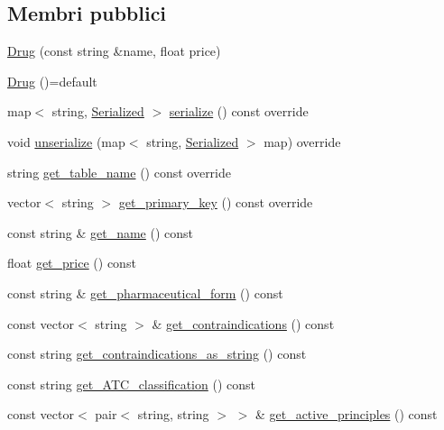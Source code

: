 \subsection*{Membri pubblici}
\begin{DoxyCompactItemize}
\item 
\mbox{\hyperlink{classmm_1_1model_1_1_drug_a23f6e0538f52bd77fb8fa511392889a6}{Drug}} (const string \&name, float price)
\item 
\mbox{\hyperlink{classmm_1_1model_1_1_drug_a60cb5ecb3ed21da2f7f7e8bc94a1019d}{Drug}} ()=default
\item 
map$<$ string, \mbox{\hyperlink{structmm_1_1_serialized}{Serialized}} $>$ \mbox{\hyperlink{classmm_1_1model_1_1_drug_a5d4fa5bf5e4700f833547c5114764c7b}{serialize}} () const override
\item 
void \mbox{\hyperlink{classmm_1_1model_1_1_drug_adc9cd19eb2d0c3c271c01c41cf10d600}{unserialize}} (map$<$ string, \mbox{\hyperlink{structmm_1_1_serialized}{Serialized}} $>$ map) override
\item 
string \mbox{\hyperlink{classmm_1_1model_1_1_drug_a7fa9dbb569b89f397d4b865b778b3751}{get\+\_\+table\+\_\+name}} () const override
\item 
vector$<$ string $>$ \mbox{\hyperlink{classmm_1_1model_1_1_drug_a019770ab95f95f34bbc204c4c3860bfa}{get\+\_\+primary\+\_\+key}} () const override
\item 
const string \& \mbox{\hyperlink{classmm_1_1model_1_1_drug_ac01bfb91a074b57a3ba3b5b6f567e726}{get\+\_\+name}} () const
\item 
float \mbox{\hyperlink{classmm_1_1model_1_1_drug_a0add6ee0680f5028d0e820033ebada20}{get\+\_\+price}} () const
\item 
const string \& \mbox{\hyperlink{classmm_1_1model_1_1_drug_a2435614b64f13687d25b04f7d9335c9a}{get\+\_\+pharmaceutical\+\_\+form}} () const
\item 
const vector$<$ string $>$ \& \mbox{\hyperlink{classmm_1_1model_1_1_drug_a9116e111f2a546dbc35fd5e08863f37a}{get\+\_\+contraindications}} () const
\item 
const string \mbox{\hyperlink{classmm_1_1model_1_1_drug_a71f9f7d210a2fd7fbad86e61affd9105}{get\+\_\+contraindications\+\_\+as\+\_\+string}} () const
\item 
const string \mbox{\hyperlink{classmm_1_1model_1_1_drug_a64a1e99b4702d83b9c94379d14b4873b}{get\+\_\+\+A\+T\+C\+\_\+classification}} () const
\item 
const vector$<$ pair$<$ string, string $>$ $>$ \& \mbox{\hyperlink{classmm_1_1model_1_1_drug_a809666171510a2511573fa65d4dcd7cb}{get\+\_\+active\+\_\+principles}} () const

\end{DoxyCompactItemize}

